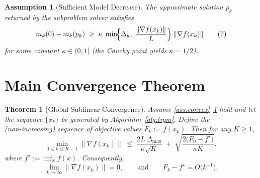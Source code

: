 \documentclass{article}
\newtheorem{assumption}{Assumption}
\newtheorem{theorem}{Theorem}
\begin{document}
\begin{assumption}[Sufficient Model Decrease]\label{ass:suff}
The approximate solution $p_k$ returned by the subproblem solver satisfies
\[
m_k(0)-m_k(p_k)\;\ge\;\kappa\;
\min\!\Bigl\{\Delta_k,\;\frac{\|\nabla f(x_k)\|}{L}\Bigr\}
\;\|\nabla f(x_k)\|
\tag{7}
\]
for some constant $\kappa\in(0,1]$ (the Cauchy point yields $\kappa=1/2$).
\end{assumption}

\section*{Main Convergence Theorem}
\begin{theorem}[Global Sublinear Convergence]\label{thm:global}
Assume \ref{ass:convex}–\ref{ass:suff} hold and let the sequence $\{x_k\}$ be generated by Algorithm~\ref{alg:trgm}.  
Define the (non‑increasing) sequence of objective values $F_k:=f(x_k)$.  
Then for any $K\ge1$,
\[
\min_{0\le k\le K-1}\|\nabla f(x_k)\|
\;\le\;
\frac{2L\,\Delta_{\max}}{\kappa\sqrt{K}}\;+\;
\sqrt{\frac{2\bigl(F_0-f^\star\bigr)}{\kappa K}},
\tag{8}
\]
where $f^\star:=\inf_{x}f(x)$.  
Consequently,
\[
\lim_{k\to\infty}\|\nabla f(x_k)\|=0,
\qquad
\text{and}\qquad
F_k-f^\star = O\!\bigl(k^{-1}\bigr).
\]
\end{theorem}
\end{document}
